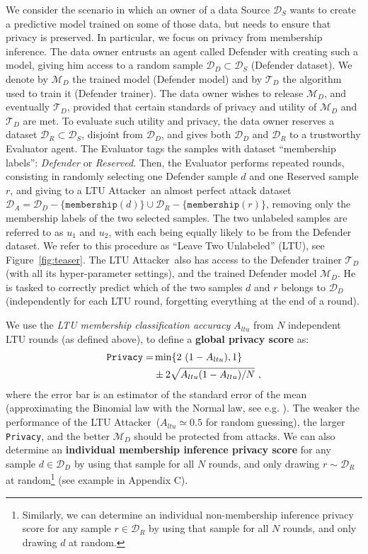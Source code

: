 \documentclass[letterpaper]{article}
\newcommand{\sminus}{-}
\newcommand{\oracle}{LTU Attacker~}
\begin{document}
We consider the scenario in which an owner of a data Source $\mathcal{D}_S$
wants to create a predictive model trained on some of those data, but needs to ensure that privacy is preserved. In particular, we focus on privacy from membership inference.
The data owner entrusts an agent called Defender with creating such a model, giving him access to a random sample $\mathcal{D}_D \subset \mathcal{D}_S$ (Defender dataset).
We denote by  $\mathcal{M}_D$ the trained model (Defender model) and by $\mathcal{T}_D$ the algorithm used to train it (Defender trainer).
The data owner wishes to release $\mathcal{M}_D$, and eventually $\mathcal{T}_D$, provided that certain standards of privacy and utility of $\mathcal{M}_D$ and $\mathcal{T}_D$ are met.
To evaluate such utility and privacy, the data owner reserves a dataset $\mathcal{D}_R \subset \mathcal{D}_S$, disjoint from $\mathcal{D}_D$, and gives both $\mathcal{D}_D$ and $\mathcal{D}_R$ to a trustworthy Evaluator agent.
The Evaluator tags the samples with dataset ``membership labels'': {\em Defender} or {\em Reserved}.
Then, the Evaluator performs repeated rounds, consisting in randomly selecting one Defender sample $d$ and one Reserved sample $r$,
and giving to a \oracle an almost perfect attack dataset $\mathcal{D}_A=\mathcal{D}_D\sminus\{\texttt{membership}(d)\} \cup \mathcal{D}_R\sminus\{\texttt{membership}(r)\}$, removing only the membership labels of the two selected samples. The two unlabeled samples are referred to as $u_1$ and $u_2$, with each being equally likely to be from the Defender dataset.
We refer to this procedure as  ``Leave Two Unlabeled'' (LTU), see Figure~\ref{fig:teaser}. The \oracle also has access to the Defender trainer $\mathcal{T}_D$ (with all its hyper-parameter settings), and the trained Defender model $\mathcal{M}_D$. He is tasked to correctly predict which of the two samples $d$ and $r$ belongs to $\mathcal{D}_D$ (independently for each LTU round, forgetting everything at the end of a round).

We use the {\em LTU membership classification accuracy} $A_{ltu}$ from $N$ independent LTU rounds (as defined above), to define a {\bf global privacy score} as:
\begin{align}\label{equation:privacy}
\texttt{Privacy} = &\min\{2~(1 - A_{ltu}), 1\} \notag \\
&\pm 2 \sqrt{A_{ltu}(1-A_{ltu})/N} ~,
\end{align}
where the error bar is an estimator of the standard error of the mean (approximating the Binomial law with the Normal law, see e.g. \cite{guyon-1998}).
The weaker the performance of the \oracle ($A_{ltu} \simeq 0.5$ for random guessing), the larger \texttt{Privacy}, and the better $\mathcal{M}_D$ should be protected from attacks.
We can also determine an {\bf individual membership inference privacy score} for any sample $d \in \mathcal{D}_{D}$ by using that sample for all $N$ rounds, and only drawing $r\sim \mathcal{D}_{R}$ at random\footnote{Similarly, we can determine an individual non-membership inference privacy score for any sample $r \in \mathcal{D}_{R}$ by using that sample for all $N$ rounds, and only drawing $d$ at random.} (see example in Appendix C).
\end{document}
